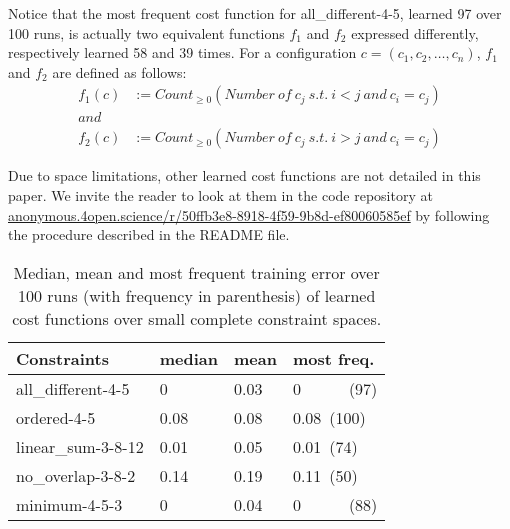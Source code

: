 \documentclass{article}
\begin{document}
Notice that  the most  frequent cost function  for all\_different-4-5,
learned 97 over  100 runs, is actually two  equivalent functions $f_1$
and $f_2$ expressed differently, respectively learned 58 and 39 times.
For a configuration $c = (c_1, c_2, \ldots, c_n)$, $f_1$ and $f_2$ are
defined as follows:
\begin{align*}
  f_1(c) &:= Count_{\geq 0}( Number\ of\ c_j\ s.t.\ i<j\ and\ c_i=c_j)\\
  and&\\
  f_2(c) &:= Count_{\geq 0}( Number\ of\ c_j\ s.t.\ i>j\ and\ c_i=c_j)
\end{align*}

Due to space limitations, other learned cost functions are not detailed in this paper.   We invite the reader to look  at them in the code                           repository                           at \href{https://anonymous.4open.science/r/50ffb3e8-8918-4f59-9b8d-ef80060585ef/}{anonymous.4open.science/r/50ffb3e8-8918-4f59-9b8d-ef80060585ef} by following the procedure described in the README file.






\begin{table}
  \centering
\begin{tabular}{|l|l|l|l|}
  \hline
  Constraints & median & mean & most freq.\\
  \hline
  all\_different-4-5 & 0 & 0.03 & 0~~~~~~(97)\\
  ordered-4-5 & 0.08 & 0.08 & 0.08~(100)\\
  linear\_sum-3-8-12 & 0.01 & 0.05 & 0.01~(74)\\
  no\_overlap-3-8-2 & 0.14 & 0.19 & 0.11~(50)\\
  minimum-4-5-3 & 0 & 0.04 & 0~~~~~~(88)\\
  \hline
\end{tabular}
\caption{Median, mean and  most frequent training error  over 100 runs
  (with frequency in parenthesis) of learned cost functions over small
  complete constraint spaces.}
\label{tab:cf_small}
\end{table}
\end{document}
